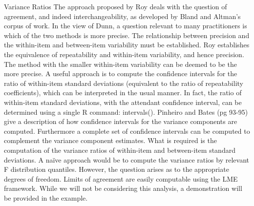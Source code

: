Variance Ratios
The approach proposed by Roy deals with the question of agreement, and indeed interchangeability, as developed by Bland and Altman’s corpus of work.  In the view of Dunn, a question relevant to many practitioners is which of the two methods is more precise.
The relationship between precision and the within-item and between-item variability must be established. Roy establishes the equivalence of repeatability and within-item variability, and hence precision.  The method with the smaller within-item variability can be deemed to be the more precise.
A useful approach is to compute the confidence intervals for the ratio of within-item standard deviations (equivalent to the ratio of repeatability coefficients), which can be interpreted in the usual manner.  
In fact, the ratio of within-item standard deviations, with the attendant confidence interval,  can be determined using a single R command: intervals().
Pinheiro and Bates (pg 93-95) give a description of how confidence intervals for the variance components are computed. Furthermore a complete set of confidence intervals can be computed to complement the variance component estimates. 
What is required is the computation of the variance ratios of within-item and between-item standard deviations.  
A naïve approach would be to compute the variance ratios by relevant F distribution quantiles. However, the question arises as to the appropriate degrees of freedom.
Limits of agreement are easily computable using the LME framework. While we will not be considering this analysis, a demonstration will be provided in the example.
